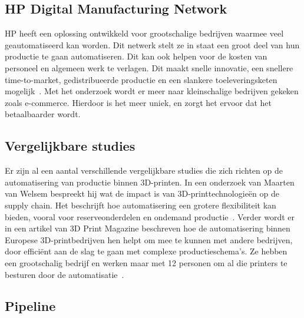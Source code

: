 \subsection{HP Digital Manufacturing Network}%

HP heeft een oplossing ontwikkeld voor grootschalige bedrijven waarmee veel geautomatiseerd kan worden. Dit netwerk stelt ze in staat een groot deel van hun productie te gaan automatiseren. Dit kan ook helpen voor de kosten van personeel en algemeen werk te verlagen. Dit maakt snelle innovatie, een snellere time-to-market, gedistribueerde productie en een slankere toeleveringsketen mogelijk~\autocite{hp3DprintingNetwork}. Met het onderzoek wordt er meer naar kleinschalige bedrijven gekeken zoals e-commerce. Hierdoor is het meer uniek, en zorgt het ervoor dat het betaalbaarder wordt.



\subsection{Vergelijkbare studies}%

Er zijn al een aantal verschillende vergelijkbare studies die zich richten op de automatisering van productie binnen 3D-printen. In een onderzoek van Maarten van Welsem bespreekt hij wat de impact is van 3D-printtechnologieën op de supply chain. Het beschrijft hoe automatisering een grotere flexibiliteit kan bieden, vooral voor reserveonderdelen en ondemand productie~\autocite{emerce3DprintSupplyChain}. Verder wordt er in een artikel van 3D Print Magazine beschreven hoe de automatisering binnen Europese 3D-printbedrijven hen helpt om mee te kunnen met andere bedrijven, door efficiënt aan de slag te gaan met complexe productieschema's. Ze hebben een grootschalig bedrijf en werken maar met 12 personen om al die printers te besturen door de automatisatie~\autocite{3dprintmagAutomation}. 


\subsection{Pipeline}%

